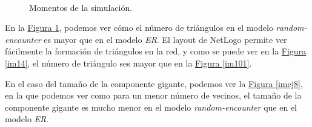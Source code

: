 \documentclass[paper=a4, fontsize=11pt]{article} %
\numberwithin{equation}{section} %
\numberwithin{figure}{section} %
\numberwithin{table}{section} %
\begin{document}
\begin{figure}[H]
    \centering
    \mbox{
        \qquad
    }
    \caption{Momentos de la simulación.}
    \label{imej7}
\end{figure}

En la \hyperref[imej7]{Figura \ref*{imej7}}, podemos ver cómo el número de triángulos en el modelo \textit{random-encounter} es mayor que en el modelo \textit{ER}. El layout de NetLogo permite ver fácilmente la formación de triángulos en la red, y como se puede ver en la \hyperref[im14]{Figura \ref*{im14}}, el número de triángulo ses mayor que en la \hyperref[im101]{Figura \ref*{im101}}.

En el caso del tamaño de la componente gigante, podemos ver la \hyperref[imej8]{Figura \ref*{imej8}}, en la que podemos ver como para un menor número de vecinos, el tamaño de la componente gigante es mucho menor en el modelo \textit{random-encounter} que en el modelo \textit{ER}.
\end{document}
